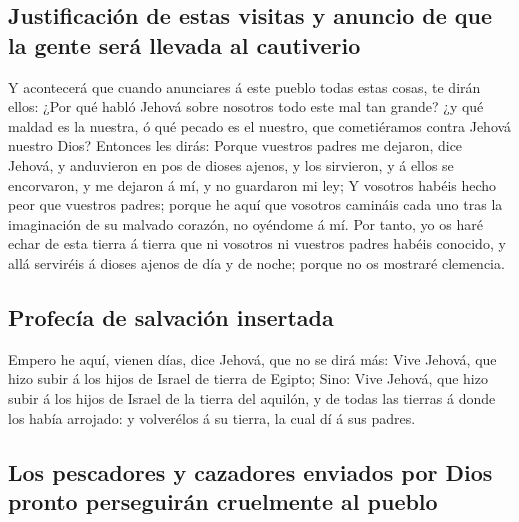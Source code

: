 \hypertarget{justificaciuxf3n-de-estas-visitas-y-anuncio-de-que-la-gente-seruxe1-llevada-al-cautiverio}{%
\subsection{Justificación de estas visitas y anuncio de que la gente
será llevada al
cautiverio}\label{justificaciuxf3n-de-estas-visitas-y-anuncio-de-que-la-gente-seruxe1-llevada-al-cautiverio}}

 Y acontecerá que cuando anunciares á este pueblo todas
estas cosas, te dirán ellos: ¿Por qué habló Jehová sobre nosotros todo
este mal tan grande? ¿y qué maldad es la nuestra, ó qué pecado es el
nuestro, que cometiéramos contra Jehová nuestro Dios? 
Entonces les dirás: Porque vuestros padres me dejaron, dice Jehová, y
anduvieron en pos de dioses ajenos, y los sirvieron, y á ellos se
encorvaron, y me dejaron á mí, y no guardaron mi ley;  Y
vosotros habéis hecho peor que vuestros padres; porque he aquí que
vosotros camináis cada uno tras la imaginación de su malvado corazón, no
oyéndome á mí.  Por tanto, yo os haré echar de esta
tierra á tierra que ni vosotros ni vuestros padres habéis conocido, y
allá serviréis á dioses ajenos de día y de noche; porque no os mostraré
clemencia.

\hypertarget{profecuxeda-de-salvaciuxf3n-insertada}{%
\subsection{Profecía de salvación
insertada}\label{profecuxeda-de-salvaciuxf3n-insertada}}

 Empero he aquí, vienen días, dice Jehová, que no se dirá
más: Vive Jehová, que hizo subir á los hijos de Israel de tierra de
Egipto;  Sino: Vive Jehová, que hizo subir á los hijos de
Israel de la tierra del aquilón, y de todas las tierras á donde los
había arrojado: y volverélos á su tierra, la cual dí á sus padres.

\hypertarget{los-pescadores-y-cazadores-enviados-por-dios-pronto-perseguiruxe1n-cruelmente-al-pueblo}{%
\subsection{Los pescadores y cazadores enviados por Dios pronto
perseguirán cruelmente al
pueblo}\label{los-pescadores-y-cazadores-enviados-por-dios-pronto-perseguiruxe1n-cruelmente-al-pueblo}}

